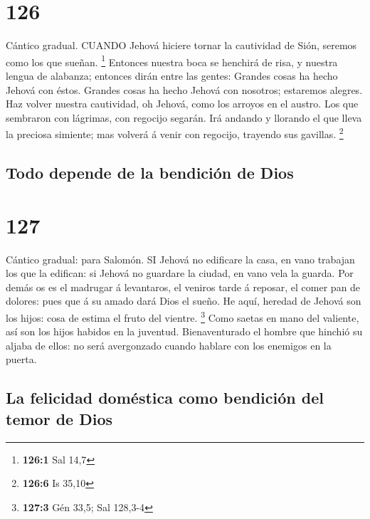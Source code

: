 \hypertarget{section-125}{%
\section{126}\label{section-125}}

 Cántico gradual. CUANDO Jehová hiciere tornar la cautividad
de Sión, seremos como los que sueñan. \footnote{\textbf{126:1} Sal 14,7}
 Entonces nuestra boca se henchirá de risa, y nuestra lengua
de alabanza; entonces dirán entre las gentes: Grandes cosas ha hecho
Jehová con éstos.  Grandes cosas ha hecho Jehová con
nosotros; estaremos alegres.  Haz volver nuestra cautividad,
oh Jehová, como los arroyos en el austro.  Los que sembraron
con lágrimas, con regocijo segarán.  Irá andando y llorando
el que lleva la preciosa simiente; mas volverá á venir con regocijo,
trayendo sus gavillas. \footnote{\textbf{126:6} Is 35,10}

\hypertarget{todo-depende-de-la-bendiciuxf3n-de-dios}{%
\subsection{Todo depende de la bendición de
Dios}\label{todo-depende-de-la-bendiciuxf3n-de-dios}}

\hypertarget{section-126}{%
\section{127}\label{section-126}}

 Cántico gradual: para Salomón. SI Jehová no edificare la
casa, en vano trabajan los que la edifican: si Jehová no guardare la
ciudad, en vano vela la guarda.  Por demás os es el madrugar
á levantaros, el veniros tarde á reposar, el comer pan de dolores: pues
que á su amado dará Dios el sueño.  He aquí, heredad de
Jehová son los hijos: cosa de estima el fruto del vientre. \footnote{\textbf{127:3}
  Gén 33,5; Sal 128,3-4}  Como saetas en mano del valiente,
así son los hijos habidos en la juventud.  Bienaventurado el
hombre que hinchió su aljaba de ellos: no será avergonzado cuando
hablare con los enemigos en la puerta.

\hypertarget{la-felicidad-domuxe9stica-como-bendiciuxf3n-del-temor-de-dios}{%
\subsection{La felicidad doméstica como bendición del temor de
Dios}\label{la-felicidad-domuxe9stica-como-bendiciuxf3n-del-temor-de-dios}}

